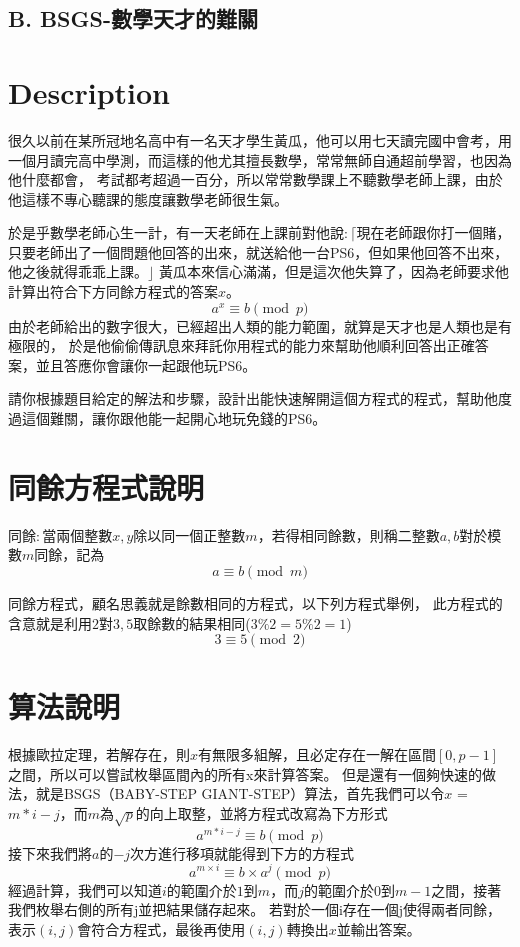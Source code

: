 \documentclass[11pt,a4paper]{article}
\begin{document}
\begin{center}
\section*{B. BSGS-數學天才的難關}
\end{center}

\section*{Description}

很久以前在某所冠地名高中有一名天才學生黃瓜，他可以用七天讀完國中會考，用一個月讀完高中學測，而這樣的他尤其擅長數學，常常無師自通超前學習，也因為他什麼都會，
考試都考超過一百分，所以常常數學課上不聽數學老師上課，由於他這樣不專心聽課的態度讓數學老師很生氣。 

於是乎數學老師心生一計，有一天老師在上課前對他說$ : \lceil $現在老師跟你打一個賭，只要老師出了一個問題他回答的出來，就送給他一台PS6，但如果他回答不出來，他之後就得乖乖上課。$ \rfloor $ 黃瓜本來信心滿滿，但是這次他失算了，因為老師要求他計算出符合下方同餘方程式的答案$x$。
$$
	a^x \equiv b \pmod{p}
$$	
由於老師給出的數字很大，已經超出人類的能力範圍，就算是天才也是人類也是有極限的，
於是他偷偷傳訊息來拜託你用程式的能力來幫助他順利回答出正確答案，並且答應你會讓你一起跟他玩PS6。

請你根據題目給定的解法和步驟，設計出能快速解開這個方程式的程式，幫助他度過這個難關，讓你跟他能一起開心地玩免錢的PS6。

\section*{同餘方程式說明}

同餘$:$當兩個整數$x, y$除以同一個正整數$m$，若得相同餘數，則稱二整數$a, b$對於模數$m$同餘，記為
$$
	a \equiv b \pmod{m}
$$

同餘方程式，顧名思義就是餘數相同的方程式，以下列方程式舉例，
此方程式的含意就是利用$2$對$3, 5$取餘數的結果相同($3\%2 = 5 \% 2 = 1$)\\
$$
	  3 \equiv 5 \pmod{2}
$$

\section*{算法說明}
根據歐拉定理，若解存在，則$x$有無限多組解，且必定存在一解在區間$[0, p-1]$之間，所以可以嘗試枚舉區間內的所有x來計算答案。
但是還有一個夠快速的做法，就是BSGS（BABY-STEP GIANT-STEP）算法，首先我們可以令$x$ = $m*i-j$，而$m$為$\sqrt{p}$的向上取整，並將方程式改寫為下方形式  
$$
	a^{m * i - j} \equiv b \pmod{p}
$$
接下來我們將$a$的$-j$次方進行移項就能得到下方的方程式 
$$
	a^{m \times i} \equiv b \times a^{j} \pmod{p}
$$	
經過計算，我們可以知道$i$的範圍介於$1$到$m$，而$j$的範圍介於$0$到$m-1$之間，接著我們枚舉右側的所有j並把結果儲存起來。
若對於一個i存在一個j使得兩者同餘，表示$(i, j)$會符合方程式，最後再使用$(i, j)$轉換出$x$並輸出答案。
\end{document}
